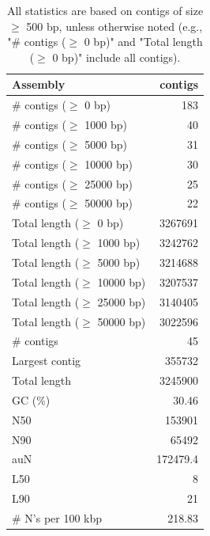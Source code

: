 \documentclass[12pt,a4paper]{article}
\begin{document}
\begin{table}[ht]
\begin{center}
\caption{All statistics are based on contigs of size $\geq$ 500 bp, unless otherwise noted (e.g., "\# contigs ($\geq$ 0 bp)" and "Total length ($\geq$ 0 bp)" include all contigs).}
\begin{tabular}{|l*{1}{|r}|}
\hline
Assembly & contigs \\ \hline
\# contigs ($\geq$ 0 bp) & 183 \\ \hline
\# contigs ($\geq$ 1000 bp) & 40 \\ \hline
\# contigs ($\geq$ 5000 bp) & 31 \\ \hline
\# contigs ($\geq$ 10000 bp) & 30 \\ \hline
\# contigs ($\geq$ 25000 bp) & 25 \\ \hline
\# contigs ($\geq$ 50000 bp) & 22 \\ \hline
Total length ($\geq$ 0 bp) & 3267691 \\ \hline
Total length ($\geq$ 1000 bp) & 3242762 \\ \hline
Total length ($\geq$ 5000 bp) & 3214688 \\ \hline
Total length ($\geq$ 10000 bp) & 3207537 \\ \hline
Total length ($\geq$ 25000 bp) & 3140405 \\ \hline
Total length ($\geq$ 50000 bp) & 3022596 \\ \hline
\# contigs & 45 \\ \hline
Largest contig & 355732 \\ \hline
Total length & 3245900 \\ \hline
GC (\%) & 30.46 \\ \hline
N50 & 153901 \\ \hline
N90 & 65492 \\ \hline
auN & 172479.4 \\ \hline
L50 & 8 \\ \hline
L90 & 21 \\ \hline
\# N's per 100 kbp & 218.83 \\ \hline
\end{tabular}
\end{center}
\end{table}
\end{document}
